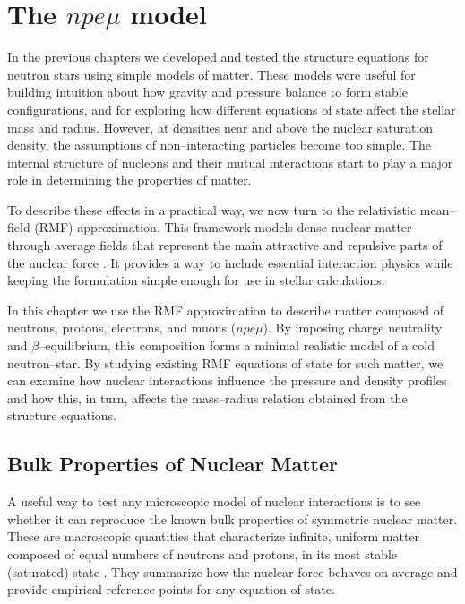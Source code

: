 \chapter{The \texorpdfstring{$npe\mu$}{npemu} model}
\label{chap:npe_mu}

In the previous chapters we developed and tested the structure equations for
neutron stars using simple models of matter. These models were useful for
building intuition about how gravity and pressure balance to form stable
configurations, and for exploring how different equations of state affect the
stellar mass and radius. However, at densities near and above the nuclear
saturation density, the assumptions of non–interacting particles become too
simple. The internal structure of nucleons and their mutual interactions start
to play a major role in determining the properties of matter.

To describe these effects in a practical way, we now turn to the relativistic
mean–field (RMF) approximation. This framework models dense nuclear matter through
average fields that represent the main attractive and repulsive parts of the
nuclear force \cite{glendenning2000,pogliano2017}. 
It provides a way to include essential interaction physics while
keeping the formulation simple enough for use in stellar calculations.

In this chapter we use the RMF approximation to describe matter composed of neutrons,
protons, electrons, and muons ($npe\mu$). By imposing charge neutrality and
$\beta$–equilibrium, this composition forms a minimal realistic model of a cold
neutron–star. By studying existing RMF equations of state for such matter,
we can examine how nuclear interactions influence the pressure and density
profiles and how this, in turn, affects the mass–radius relation obtained from
the structure equations.

\section{Bulk Properties of Nuclear Matter}
\label{sec:bulk_properties}

A useful way to test any microscopic model of nuclear interactions is to see
whether it can reproduce the known bulk properties of symmetric nuclear matter.
These are macroscopic quantities that characterize infinite, uniform matter
composed of equal numbers of neutrons and protons, in its most stable (saturated)
state \cite{glendenning2000}. They summarize how the nuclear force behaves on average and provide
empirical reference points for any equation of state.

